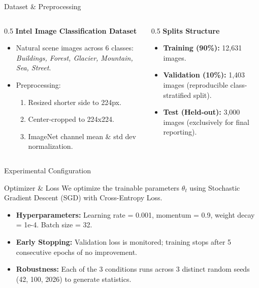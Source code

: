 \documentclass[aspectratio=169]{beamer}
\begin{document}
\begin{frame}{Dataset \& Preprocessing}
  \begin{columns}
    \begin{column}{0.5\textwidth}
      \textbf{Intel Image Classification Dataset}
      \begin{itemize}
        \item Natural scene images across 6 classes: \textit{Buildings, Forest, Glacier, Mountain, Sea, Street}.
        \item Preprocessing:
          \begin{enumerate}
            \item Resized shorter side to 224px.
            \item Center-cropped to 224x224.
            \item ImageNet channel mean \& std dev normalization.
          \end{enumerate}
      \end{itemize}
    \end{column}
    \begin{column}{0.5\textwidth}
      \textbf{Splits Structure}
      \begin{itemize}
        \item \textbf{Training (90\%):} 12,631 images.
        \item \textbf{Validation (10\%):} 1,403 images (reproducible class-stratified split).
        \item \textbf{Test (Held-out):} 3,000 images (exclusively for final reporting).
      \end{itemize}
    \end{column}
  \end{columns}
\end{frame}

\begin{frame}{Experimental Configuration}
  \begin{block}{Optimizer \& Loss}
    We optimize the trainable parameters $\theta_t$ using Stochastic Gradient Descent (SGD) with Cross-Entropy Loss.
  \end{block}
  \begin{itemize}
    \item \textbf{Hyperparameters:} Learning rate = 0.001, momentum = 0.9, weight decay = 1e-4. Batch size = 32.
    \item \textbf{Early Stopping:} Validation loss is monitored; training stops after 5 consecutive epochs of no improvement.
    \item \textbf{Robustness:} Each of the 3 conditions runs across 3 distinct random seeds (42, 100, 2026) to generate statistics.
  \end{itemize}
\end{frame}
\end{document}
